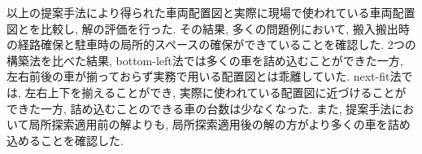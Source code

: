 以上の提案手法により得られた車両配置図と実際に現場で使われている車両配置図とを比較し, 解の評価を行った. 
その結果, 多くの問題例において, 搬入搬出時の経路確保と駐車時の局所的スペースの確保ができていることを確認した. 
2つの構築法を比べた結果, bottom-left法では多くの車を詰め込むことができた一方, 左右前後の車が揃っておらず実務で用いる配置図とは乖離していた. 
next-fit法では, 左右上下を揃えることができ, 実際に使われている配置図に近づけることができた一方, 詰め込むことのできる車の台数は少なくなった.  
また, 提案手法において局所探索適用前の解よりも, 局所探索適用後の解の方がより多くの車を詰め込めることを確認した. 
